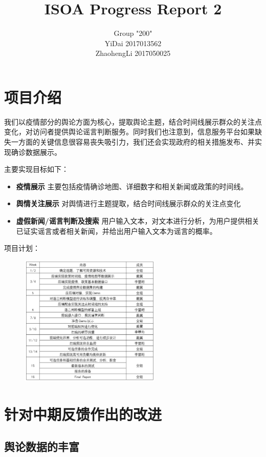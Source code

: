 \documentclass{article}
\title{ISOA Progress Report 2}
\author{Group "200"\\YiDai 2017013562\\ZhaohengLi 2017050025}
\begin{document}
\maketitle
\section{项目介绍}
我们以疫情部分的舆论方面为核心，提取舆论主题，结合时间线展示群众的关注点变化，对访问者提供舆论谣言判断服务。同时我们也注意到，信息服务平台如果缺失一方面的关键信息很容易丧失吸引力，我们还会实现政府的相关措施发布、并实现确诊数据展示。

主要实现目标如下：
\begin{itemize}
	\item{\textbf{疫情展示}} 主要包括疫情确诊地图、详细数字和相关新闻或政策的时间线。
	\item{\textbf{舆情关注展示}} 对舆情进行主题提取，结合时间线展示群众的关注点变化
	\item{\textbf{虚假新闻/谣言判断及搜索}} 用户输入文本，对文本进行分析，为用户提供相关已证实谣言或者相关新闻，并给出用户输入文本为谣言的概率。
\end{itemize}

项目计划：
\begin{figure}[H]
\centering
\includegraphics[width=0.6\textwidth]{pic1.png}
\end{figure}


\section{针对中期反馈作出的改进}

\subsection{舆论数据的丰富}
\end{document}

